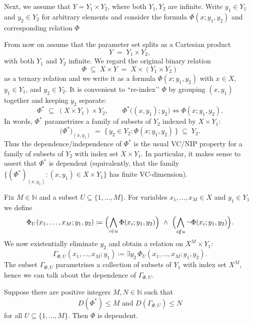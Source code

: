 Next, we assume that $Y = Y_1 \times Y_2$, where both $Y_1, Y_2$ are infinite. Write $y_1 \in Y_1$ and $y_2 \in Y_2$ for arbitrary elements and consider the formula $\Phi(x; y_1, y_2)$ and corresponding relation $\Phi$

From now on assume that the parameter set splits as a Cartesian product
\[
    Y \;=\; Y_1\times Y_2,
\]
with both $Y_1$ and $Y_2$ infinite. We regard the original binary relation
\[
    \Phi \;\subseteq\; X\times Y \;=\; X\times (Y_1\times Y_2)
\]
as a ternary relation and we write it as a formula $\Phi(x;y_1,y_2)$ with
$x\in X$, $y_1\in Y_1$, and $y_2\in Y_2$. It is convenient to ``re-index’’
$\Phi$ by grouping $(x,y_1)$ together and keeping $y_2$ separate:
\[
    \Phi^\ast \;\subseteq\; (X\times Y_1)\times Y_2,
    \qquad
    \Phi^\ast\bigl((x,y_1);y_2\bigr) \iff \Phi(x;y_1,y_2).
\]
In words, $\Phi^\ast$ parametrizes a family of subsets of $Y_2$ indexed by
$X\times Y_1$:
\[
    \bigl(\Phi^\ast\bigr)_{(x,y_1)}
    \;=\; \{\,y_2\in Y_2 : \Phi(x;y_1,y_2)\,\}
    \;\subseteq\; Y_2.
\]
Thus the dependence/independence of $\Phi^\ast$ is the usual VC/NIP property
for a family of subsets of $Y_2$ with index set $X\times Y_1$. In particular,
it makes sense to assert that $\Phi^\ast$ is dependent (equivalently, that the
family $\{(\Phi^\ast)_{(x,y_1)} : (x,y_1)\in X\times Y_1\}$ has finite VC-dimension).


Fix $M\in\mathbb{N}$ and a subset $U\subseteq \{1,\dots,M\}$. For variables
$x_1,\dots,x_M\in X$ and $y_1\in Y_1$ we define
\[
    \Phi_{U}(x_1,\dots,x_M; y_1,y_2)\coloneq\Bigl(\bigwedge_{i\in u}\Phi(x_i;y_1,y_2)\Bigr)\ \land\
    \Bigl(\bigwedge_{i\notin u}\neg\Phi(x_i;y_1,y_2)\Bigr).
\]
We now existentially eliminate $y_2$ and obtain a relation on $X^M\times Y_1$:
\[
    \Gamma_{\Phi,U}(x_1,\dots,x_M; y_1) \coloneq \exists y_2\, \Phi_{U}(x_1,\dots,x_M; y_1,y_2).
\]
The subset $\Gamma_{\Phi,U}$ parametrises a collection of subsets of $Y_1$ with index set $X^M$, hence we can talk about the dependence of $\Gamma_{\Phi,U}$.

\begin{theorem}{\label{thm:main-theorem-2}}
    Suppose there are positive integers $M, N \in \mathbb{N}$ such that
    \[
        D(\Phi^{*}) \leq M \text{ and } D(\Gamma_{\Phi, U}) \leq N
    \]
    for all $U \subseteq \{1, \dots, M\}$. Then $\Phi$ is dependent.
\end{theorem}

